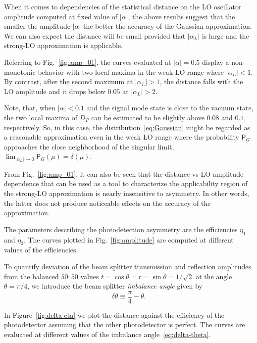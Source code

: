 \documentclass[%
reprint,
superscriptaddress,
 amsmath,amssymb,amsfonts,
 aps,
 pra,
 longbibliography
]{revtex4-2}
\newcommand{\prob}{\mathsf{P}}
\begin{document}
When it comes to dependencies of the statistical distance on
the LO oscillator amplitude
computed at fixed value of $|\alpha|$,
the above results suggest that the smaller the amplitude $|\alpha|$
the better the accuracy of the Gaussian approximation.
We can also expect the distance
will be small provided that $\left|\alpha_L\right|$ is large
and the strong-LO approximation is applicable. 


Referring to Fig.~\ref{fig:amp_01},
the curves evaluated at $|\alpha|=0.5$
display a non-monotonic behavior with two local maxima
in the weak LO range where $\left|\alpha_L\right|<1$.
By contrast, after the second maximum at $\left|\alpha_L\right|>1$,
the distance falls with the LO amplitude
and it drops below $0.05$ at $\left|\alpha_L\right|>2$.

Note, that, when $|\alpha|<0.1$
and the signal mode state is close to the vacuum state,
the two local maxima of $D_P$ can be estimated to be slightly above $0.08$ and $0.1$,
respectively. So, in this case, the distribution~\eqref{eq:Gaussian}
might be regarded as a reasonable approximation even in the
weak LO range where
the probability $\prob_G$ approaches the close neighborhood of
the singular limit,
$\lim_{\left|\alpha_L\right|\to 0}\prob_G(\mu)=\delta(\mu)$. 


From Fig.~\ref{fig:amp_01},
it can also be seen that
the distance vs LO amplitude dependence
that can be used as a tool to characterize
the applicability region of the strong-LO approximation
is nearly insensitive to asymmetry.
In other words, the latter does not produce noticeable effects on
the accuracy of the approximation.


The parameters describing
the photodetection asymmetry are
the efficiencies $\eta_1$ and $\eta_2$.
The curves plotted in Fig.~\ref{fig:amplitude}
are computed at different values of the efficiencies.

To quantify deviation of the beam splitter
transmission and reflection amplitudes
from the balanced $50:50$ values
$t=\cos\theta=r=\sin\theta=1/\sqrt{2}$ at
the angle $\theta=\pi/4$,
we introduce the beam splitter \textit{imbalance angle} given by
\begin{equation}
  \label{eq:delta-theta}
        \delta\theta\equiv\frac{\pi}{4}-\theta.
      \end{equation}

      In Figure~\ref{fig:delta-eta}
      we plot the distance against
      the efficiency of the photodetector assuming that the
      other photodetector is perfect.
      The curves are evaluated at different values of the
      imbalance angle~\eqref{eq:delta-theta}.
\end{document}
